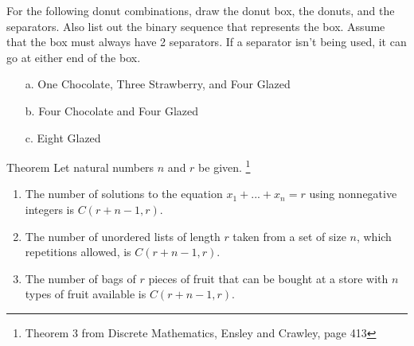     \begin{questionNOGRADE}{\thequestion}
        For the following donut combinations, draw the donut box, the donuts, and the separators.
        Also list out the binary sequence that represents the box.
        Assume that the box must always have 2 separators. If a separator isn't being used, it can
        go at either end of the box.

        \begin{enumerate}
            \item[a.]   One Chocolate, Three Strawberry, and Four Glazed
            \item[b.]   Four Chocolate and Four Glazed
            \item[c.]   Eight Glazed
        \end{enumerate}
    \end{questionNOGRADE}

    \newpage

    \begin{intro}{Theorem}
        Let natural numbers $n$ and $r$ be given.
        \footnote{Theorem 3 from Discrete Mathematics, Ensley and Crawley, page 413}

        \begin{enumerate}
            \item   The number of solutions to the equation $x_{1} + ... + x_{n} = r$
            using nonnegative integers is $C(r + n - 1, r)$.
            \item   The number of unordered lists of length $r$ taken from a set of size $n$,
            which repetitions allowed, is $C(r + n - 1, r)$.
            \item   The number of bags of $r$ pieces of fruit that can be bought at a store with $n$
            types of fruit available is $C(r + n - 1, r)$.
        \end{enumerate}
    \end{intro}
    
